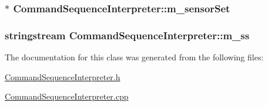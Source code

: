\hypertarget{classCommandSequenceInterpreter_ad0c5aa0524c53759ec691efebcca5233}{
\subsubsection[{m\-\_\-sensor\-Set}]{$\ast$ Command\-Sequence\-Interpreter\-::m\-\_\-sensor\-Set}}\label{classCommandSequenceInterpreter_ad0c5aa0524c53759ec691efebcca5233}
\hypertarget{classCommandSequenceInterpreter_af00adda23c01ffa7092ac6c8304de4fd}{
\subsubsection[{m\-\_\-ss}]{\setlength{\rightskip}{0pt plus 5cm}stringstream Command\-Sequence\-Interpreter\-::m\-\_\-ss}}\label{classCommandSequenceInterpreter_af00adda23c01ffa7092ac6c8304de4fd}


The documentation for this class was generated from the following files\-:\begin{DoxyCompactItemize}
\item 
\hyperlink{CommandSequenceInterpreter_8h}{Command\-Sequence\-Interpreter.\-h}\item 
\hyperlink{CommandSequenceInterpreter_8cpp}{Command\-Sequence\-Interpreter.\-cpp}\end{DoxyCompactItemize}
